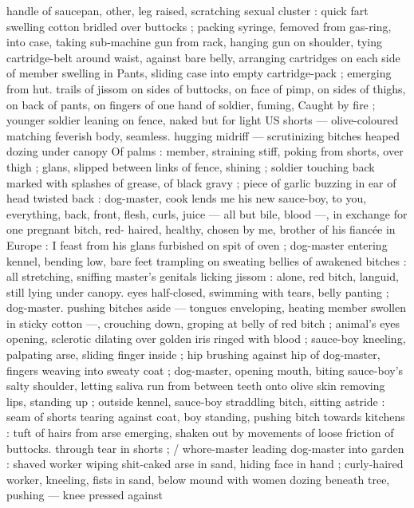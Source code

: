 handle of saucepan, other, leg raised, scratching sexual cluster : 
quick fart swelling cotton bridled over buttocks ; packing syringe, 
femoved from gas-ring, into case, taking sub-machine gun from rack, 
hanging gun on shoulder, tying cartridge-belt around waist, against 
bare belly, arranging cartridges on each side of member swelling in 
Pants, sliding case into empty cartridge-pack ; emerging from hut. 
trails of jissom on sides of buttocks, on face of pimp, on sides of 
thighs, on back of pants, on fingers of one hand of soldier, fuming, 
Caught by fire ; younger soldier leaning on fence, naked but for light 
US shorts --- olive-coloured matching feverish body, seamless. 
hugging midriff --- scrutinizing bitches heaped dozing under canopy 
Of palms : member, straining stiff, poking from shorts, over thigh ; 
glans, slipped between links of fence, shining ; soldier touching back 
marked with splashes of grease, of black gravy ; piece of garlic 
buzzing in ear of head twisted back : {\gl}{\td} dog-master, cook lends me 
his new sauce-boy, to you, everything, back, front, flesh, curls, juice 
--- all but bile, blood ---, in exchange for one pregnant bitch, red- 
haired, healthy, chosen by me, brother of his fiancée in Europe : I 
feast from his glans furbished on spit of oven{\thd} {\gr} ; dog-master 
entering kennel, bending low, bare feet trampling on sweating bellies 
of awakened bitches : all stretching, sniffing master's genitals 
licking jissom : alone, red bitch, languid, still lying under canopy. 
eyes half-closed, swimming with tears, belly panting ; dog-master. 
pushing bitches aside --- tongues enveloping, heating member 
swollen in sticky cotton ---, crouching down, groping at belly of red 
bitch ; animal's eyes opening, sclerotic dilating over golden iris 
ringed with blood ; sauce-boy kneeling, palpating arse, sliding finger 
inside ; hip brushing against hip of dog-master, fingers weaving into 
sweaty coat ; dog-master, opening mouth, biting sauce-boy's salty 
shoulder, letting saliva run from between teeth onto olive skin 
removing lips, standing up ; outside kennel, sauce-boy straddling 
bitch, sitting astride : seam of shorts tearing against coat, boy 
standing, pushing bitch towards kitchens : tuft of hairs from arse 
emerging, shaken out by movements of loose friction of buttocks. 
through tear in shorts ; {\slash} whore-master leading dog-master into 
garden : shaved worker wiping shit-caked arse in sand, hiding face 
in hand ; curly-haired worker, kneeling, fists in sand, below mound 
with women dozing beneath tree, pushing --- knee pressed against 
